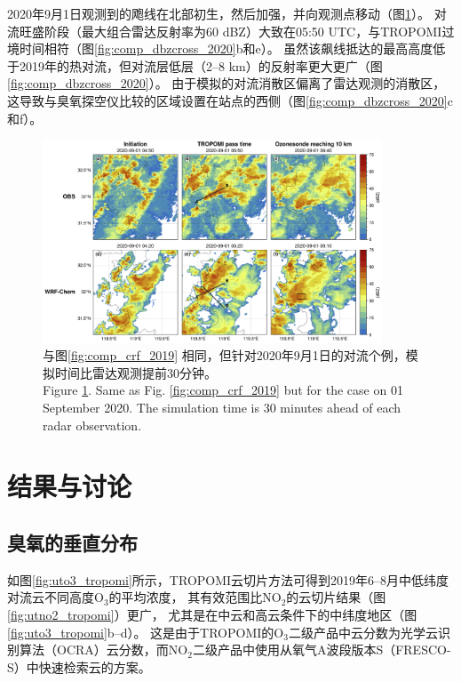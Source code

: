 2020年9月1日观测到的飑线在北部初生，然后加强，并向观测点移动（图\ref{fig:comp_crf_2020}）。
对流旺盛阶段（最大组合雷达反射率为60 dBZ）大致在05:50 UTC，与TROPOMI过境时间相符（图\ref{fig:comp_dbzcross_2020}b和e）。
虽然该飙线抵达的最高高度低于2019年的热对流，但对流层低层（2--8 km）的反射率更大更广（图\ref{fig:comp_dbzcross_2020}）。
由于模拟的对流消散区偏离了雷达观测的消散区，这导致与臭氧探空仪比较的区域设置在站点的西侧（图\ref{fig:comp_dbzcross_2020}c和f）。


\begin{figure}[H]
\centering
\includegraphics[width=0.9\textwidth]{./figures/comp_crf_2020.png}
\caption{与图\ref{fig:comp_crf_2019} 相同，但针对2020年9月1日的对流个例，模拟时间比雷达观测提前30分钟。\\
Figure \ref{fig:comp_crf_2020}. Same as Fig. \ref{fig:comp_crf_2019} but for the case on 01 September 2020.
The simulation time is 30 minutes ahead of each radar observation.}
\label{fig:comp_crf_2020}
\end{figure}

\section{结果与讨论}

\subsection{臭氧的垂直分布} \label{sec:o3_profile}

如图\ref{fig:uto3_tropomi}所示，TROPOMI云切片方法可得到2019年6--8月中低纬度对流云不同高度O$_3$的平均浓度，
其有效范围比NO$_2$的云切片结果（图\ref{fig:utno2_tropomi}）更广，
尤其是在中云和高云条件下的中纬度地区（图\ref{fig:uto3_tropomi}b--d）。
这是由于TROPOMI的O$_3$二级产品中云分数为光学云识别算法（OCRA）云分数，而NO$_2$二级产品中使用从氧气A波段版本S（FRESCO-S）中快速检索云的方案。

